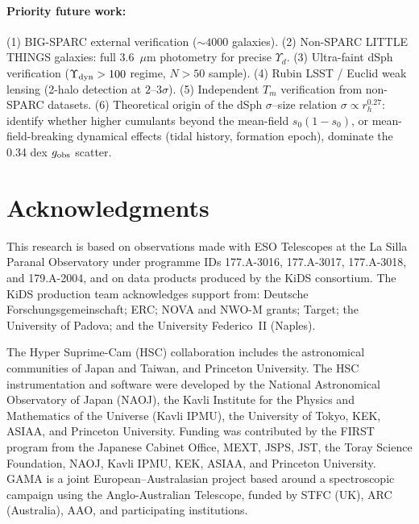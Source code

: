 \documentclass[11pt,a4paper]{article}
\newcommand{\gobs}{g_{\rm obs}}
\newcommand{\Yd}{\Upsilon_{d}}
\newcommand{\Ydyn}{\Upsilon_{\rm dyn}}
\newcommand{\Tm}{T_{m}}
\newcommand{\so}{s_{0}}
\newcommand{\rh}{r_{h}}
\begin{document}
\paragraph{Priority future work:}
(1) BIG-SPARC external verification ($\sim 4000$ galaxies).
(2) Non-SPARC LITTLE THINGS galaxies: full 3.6~$\mu$m photometry for precise $\Yd$.
(3) Ultra-faint dSph verification ($\Ydyn > 100$ regime, $N > 50$ sample).
(4) Rubin LSST / Euclid weak lensing (2-halo detection at $2\text{--}3\sigma$).
(5) Independent $\Tm$ verification from non-SPARC datasets.
(6) Theoretical origin of the dSph $\sigma$--size relation $\sigma \propto \rh^{0.27}$: identify whether
higher cumulants beyond the mean-field $\so(1 - \so)$, or mean-field-breaking dynamical effects (tidal
history, formation epoch), dominate the 0.34 dex $\gobs$ scatter.

\section*{Acknowledgments}

This research is based on observations made with ESO Telescopes at the La Silla Paranal Observatory under
programme IDs 177.A-3016, 177.A-3017, 177.A-3018, and 179.A-2004, and on data products produced by the KiDS
consortium. The KiDS production team acknowledges support from: Deutsche Forschungsgemeinschaft; ERC; NOVA
and NWO-M grants; Target; the University of Padova; and the University Federico~II (Naples).

The Hyper Suprime-Cam (HSC) collaboration includes the astronomical communities of Japan and Taiwan, and
Princeton University. The HSC instrumentation and software were developed by the National Astronomical
Observatory of Japan (NAOJ), the Kavli Institute for the Physics and Mathematics of the Universe (Kavli
IPMU), the University of Tokyo, KEK, ASIAA, and Princeton University. Funding was contributed by the FIRST
program from the Japanese Cabinet Office, MEXT, JSPS, JST, the Toray Science Foundation, NAOJ, Kavli IPMU,
KEK, ASIAA, and Princeton University. GAMA is a joint European--Australasian project based around a
spectroscopic campaign using the Anglo-Australian Telescope, funded by STFC (UK), ARC (Australia), AAO, and
participating institutions.


\nocite{*}  %

\end{document}
